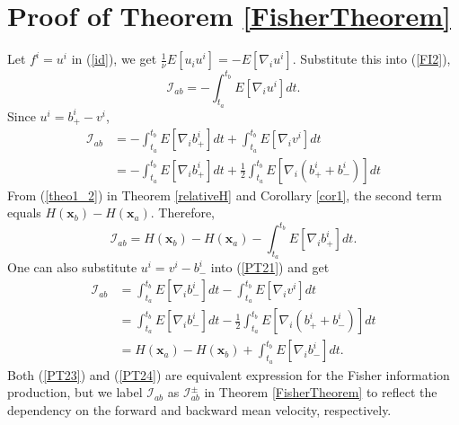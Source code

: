 \documentclass[%
 aip, 
 amsmath,amssymb,amsthm,
 nofootinbib,
 reprint,
]{revtex4-1}
\begin{document}
\section{Proof of Theorem \ref{FisherTheorem}}
\label{AppendixE}
Let $f^i=u^i$ in (\ref{id}), we get $\frac{1}{\nu}E[u_iu^i] = -E[\nabla_iu^i]$. Substitute this into (\ref{FI2}),
\begin{equation}
    \label{PT21}
    \mathcal{I}_{ab} = - \int_{t_a}^{t_b} E[\nabla_iu^i] dt.
\end{equation}
Since $u^i = b_+^i - v^i$,
\begin{equation}
    \label{PT22}
    \begin{split}
    \mathcal{I}_{ab} &= - \int_{t_a}^{t_b} E[\nabla_ib_+^i] dt + \int_{t_a}^{t_b} E[\nabla_iv^i]dt\\
    &=- \int_{t_a}^{t_b} E[\nabla_ib_+^i] dt + \frac{1}{2}\int_{t_a}^{t_b} E[\nabla_i(b_+^i+b_-^i)]dt
    \end{split}
\end{equation}
From (\ref{theo1_2}) in Theorem \ref{relativeH} and Corollary \ref{cor1}, the second term equals $H(\mathbf{x}_b) - H(\mathbf{x}_a)$. Therefore,
\begin{equation}
    \label{PT23}
    \mathcal{I}_{ab} = H(\mathbf{x}_b) - H(\mathbf{x}_a) - \int_{t_a}^{t_b} E[\nabla_ib_+^i] dt.
\end{equation}
One can also substitute $u^i = v^i-b_-^i$ into (\ref{PT21}) and get
\begin{equation}
    \label{PT24}
    \begin{split}
    \mathcal{I}_{ab} &= \int_{t_a}^{t_b} E[\nabla_ib_-^i] dt - \int_{t_a}^{t_b} E[\nabla_iv^i]dt\\
    &=\int_{t_a}^{t_b} E[\nabla_ib_-^i] dt - \frac{1}{2}\int_{t_a}^{t_b} E[\nabla_i(b_+^i+b_-^i)]dt \\
    &=H(\mathbf{x}_a) - H(\mathbf{x}_b) + \int_{t_a}^{t_b} E[\nabla_ib_-^i] dt.
    \end{split}
\end{equation}
Both (\ref{PT23}) and (\ref{PT24}) are equivalent expression for the Fisher information production, but we label $\mathcal{I}_{ab}$ as $\mathcal{I}_{ab}^{\pm}$ in Theorem \ref{FisherTheorem} to reflect the dependency on the forward and backward mean velocity, respectively.


\end{document}
